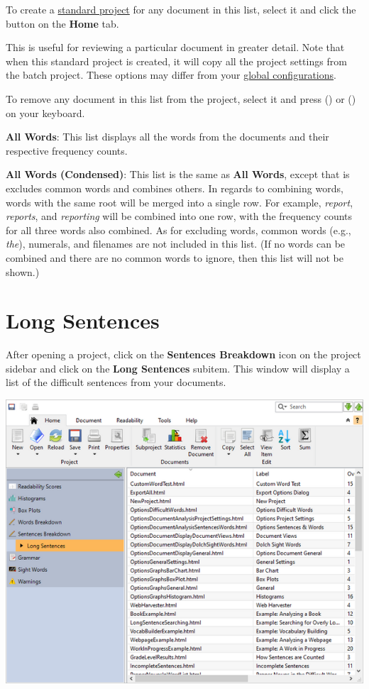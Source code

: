 \documentclass[
]{book}
\theoremstyle{definition}
\theoremstyle{definition}
\theoremstyle{definition}
\theoremstyle{definition}
\theoremstyle{remark}
\begin{document}
To create a \protect\hyperlink{creating-standard-project}{standard project} for any document in this list, select it and click the  button on the \textbf{Home} tab.

This is useful for reviewing a particular document in greater detail. Note that when this standard project is created, it will copy all the project settings from the batch project. These options may differ from your \protect\hyperlink{options-overview}{global configurations}.

To remove any document in this list from the project, select it and press  (\faWindows) or \keys{\backdel} (\faApple) on your keyboard.

\textbf{All Words}: This list displays all the words from the documents and their respective frequency counts.

\textbf{All Words (Condensed)}: This list is the same as \textbf{All Words}, except that is excludes common words and combines others. In regards to combining words, words with the same root will be merged into a single row. For example, \emph{report}, \emph{reports}, and \emph{reporting} will be combined into one row, with the frequency counts for all three words also combined. As for excluding words, common words (e.g., \emph{the}), numerals, and filenames are not included in this list. (If no words can be combined and there are no common words to ignore, then this list will not be shown.)

\hypertarget{reviewing-batch-long-sentences}{%
\section{Long Sentences}\label{reviewing-batch-long-sentences}}

After opening a project, click on the \textbf{Sentences Breakdown} icon on the project sidebar and click on the \textbf{Long Sentences} subitem. This window will display a list of the difficult sentences from your documents.

\includegraphics{Images/batchlongsentences.png}
\end{document}
